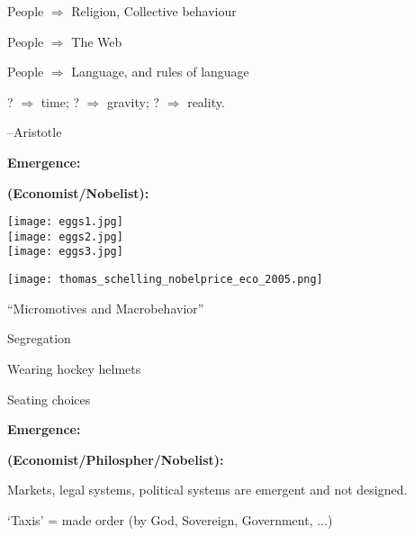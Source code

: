 \begin{frame}[plain]
\begin{frame}[plain]
      People $\Rightarrow$ Religion, Collective behaviour
    
      People $\Rightarrow$ The Web
    
      People $\Rightarrow$ Language, and rules of language
    
      ? $\Rightarrow$ time; 
      ? $\Rightarrow$ gravity;
      ? $\Rightarrow$ reality.
    
  

  
    --Aristotle
  



  \textbf{Emergence:}

  \textbf{
      \smallskip
      (Economist/Nobelist):}
    \medskip
          
      \texttt{[image: eggs1.jpg]}\\
      \texttt{[image: eggs2.jpg]}\\
      \texttt{[image: eggs3.jpg]}\\
      
      \begin{center}
      \texttt{[image: thomas\_schelling\_nobelprice\_eco\_2005.png]}
      
       
        ``Micromotives and Macrobehavior''\cite{schelling1978a}
        
        
          Segregation\cite{schelling1971a,schelling2006a}
        
          Wearing hockey helmets\cite{schelling1973a}
        
          Seating choices
        
      
      \end{center}
      




  \textbf{Emergence:}

  \textbf{
      \smallskip
      (Economist/Philospher/Nobelist):
    }
    
     Markets, legal systems, political systems are emergent and not designed.
       
      `Taxis' = made order (by God, Sovereign, Government, ...)
    

\end{frame}
\end{frame}
